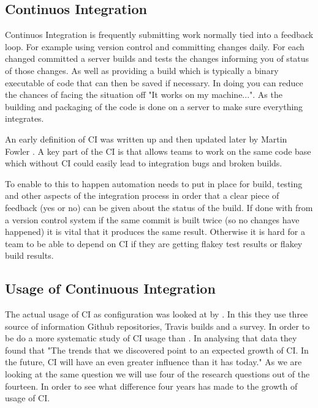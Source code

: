 \documentclass[twoside,12pt,titlepage,a4paper]{article}
\begin{document}
\subsection{Continuos Integration}
\vspace*{-0.05in}

Continuos Integration is frequently submitting work normally tied into a feedback loop. For example using version control and committing changes daily. For each changed committed a server builds and tests the changes informing you of status of those changes. As well as providing a build which is typically a binary executable of code that can then be saved if necessary. In doing you can reduce the chances of facing the situation off "It works on my machine...". As the building and packaging of the code is done on a server to make sure everything integrates.

An early definition of CI was written up and then updated later by Martin Fowler \cite{CI2010_MartinFowler}. A key part of the CI is that allows teams to work on the same code base which without CI could easily lead to integration bugs and broken builds. 

To enable to this to happen automation needs to put in place for build, testing and other aspects of the integration process in order that a clear piece of feedback (yes or no) can be given about the status of the build. If done with from a version control system if the same commit is built twice (so no changes have happened) it is vital that it produces the same result. Otherwise it is hard for a team to be able to depend on CI if they are getting flakey test results or flakey build results.

\vspace*{-0.05in}
\subsection{Usage of Continuous Integration}
\vspace*{-0.05in}

The actual usage of CI as configuration was looked at by \cite{Hilton2016}. In this they use three source of information Github repositories, Travis builds and a survey. In order to be do a more systematic study of CI usage than \cite{Vasilescu2015}. In analysing that data they found that "The trends that we discovered point to an expected growth of CI. In the future, CI will have an even greater influence than it has today." As we are looking at the same question we will use four of the research questions out of the fourteen. In order to see what difference four years has made to the growth of usage of CI.
\end{document}
